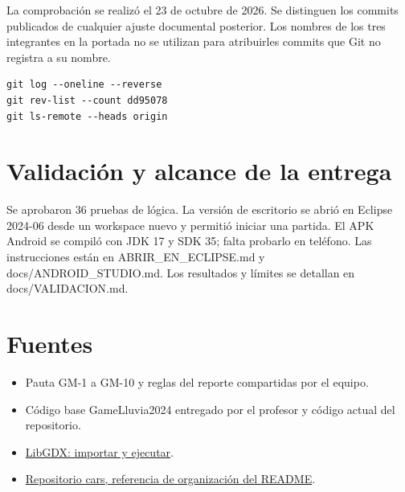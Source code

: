 La comprobación se realizó el 23 de octubre de 2026. Se distinguen los commits publicados de cualquier ajuste documental posterior. Los nombres de los tres integrantes en la portada no se utilizan para atribuirles commits que Git no registra a su nombre.

\begin{verbatim}
git log --oneline --reverse
git rev-list --count dd95078
git ls-remote --heads origin
\end{verbatim}

\section{Validación y alcance de la entrega}

Se aprobaron 36 pruebas de lógica. La versión de escritorio se abrió en Eclipse 2024-06 desde un workspace nuevo y permitió iniciar una partida. El APK Android se compiló con JDK 17 y SDK 35; falta probarlo en teléfono. Las instrucciones están en ABRIR\_EN\_ECLIPSE.md y docs/ANDROID\_STUDIO.md. Los resultados y límites se detallan en docs/VALIDACION.md.

\section{Fuentes}

\begin{itemize}
\item Pauta GM-1 a GM-10 y reglas del reporte compartidas por el equipo.
\item Código base GameLluvia2024 entregado por el profesor y código actual del repositorio.
\item \href{https://libgdx.com/wiki/start/import-and-running}{LibGDX: importar y ejecutar}.
\item \href{https://github.com/Schiz0idCat/cars/blob/main/README.md}{Repositorio cars, referencia de organización del README}.
\end{itemize}

